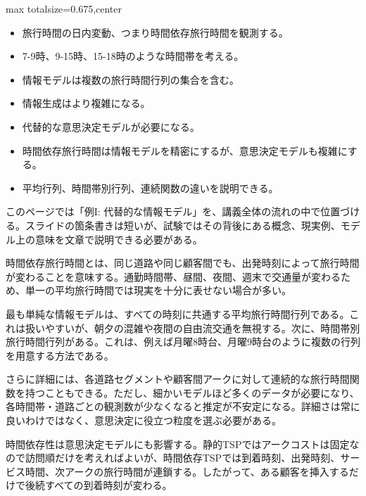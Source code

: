 \clearpage
{}
\begin{adjustbox}{max totalsize={\textwidth}{0.675\textheight},center}
\begin{minipage}{\textwidth}\scriptsize
\begin{minipage}[t]{0.485\textwidth}
\begin{itemize}
\item 旅行時間の日内変動、つまり時間依存旅行時間を観測する。
\item 7-9時、9-15時、15-18時のような時間帯を考える。
\item 情報モデルは複数の旅行時間行列の集合を含む。
\item 情報生成はより複雑になる。
\item 代替的な意思決定モデルが必要になる。
\end{itemize}
\begin{itemize}
\item 時間依存旅行時間は情報モデルを精密にするが、意思決定モデルも複雑にする。
\item 平均行列、時間帯別行列、連続関数の違いを説明できる。
\end{itemize}
\end{minipage}\hfill
\begin{minipage}[t]{0.485\textwidth}
このページでは「例I: 代替的な情報モデル」を、講義全体の流れの中で位置づける。スライドの箇条書きは短いが、試験ではその背後にある概念、現実例、モデル上の意味を文章で説明できる必要がある。\par
時間依存旅行時間とは、同じ道路や同じ顧客間でも、出発時刻によって旅行時間が変わることを意味する。通勤時間帯、昼間、夜間、週末で交通量が変わるため、単一の平均旅行時間では現実を十分に表せない場合が多い。\par
最も単純な情報モデルは、すべての時刻に共通する平均旅行時間行列である。これは扱いやすいが、朝夕の混雑や夜間の自由流交通を無視する。次に、時間帯別旅行時間行列がある。これは、例えば月曜8時台、月曜9時台のように複数の行列を用意する方法である。\par
さらに詳細には、各道路セグメントや顧客間アークに対して連続的な旅行時間関数を持つこともできる。ただし、細かいモデルほど多くのデータが必要になり、各時間帯・道路ごとの観測数が少なくなると推定が不安定になる。詳細さは常に良いわけではなく、意思決定に役立つ粒度を選ぶ必要がある。\par
時間依存性は意思決定モデルにも影響する。静的TSPではアークコストは固定なので訪問順だけを考えればよいが、時間依存TSPでは到着時刻、出発時刻、サービス時間、次アークの旅行時間が連鎖する。したがって、ある顧客を挿入するだけで後続すべての到着時刻が変わる。\par

\end{minipage}
\end{minipage}
\end{adjustbox}
